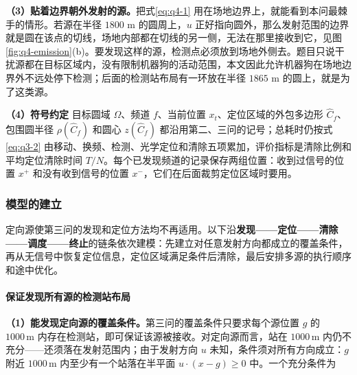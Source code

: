 \textbf{（3）贴着边界朝外发射的源。}把式\eqref{eq:q4-1} 用在场地边界上，就能看到本问最棘手的情形。若源在半径 $1800$ m 的圆周上，$u$ 正好指向圆外，那么发射范围的边界就是圆在该点的切线，场地内部都在切线的另一侧，无法在那里接收到它，见图\ref{fig:q4-emission}(b)。要发现这样的源，检测点必须放到场地外侧去。题目只说干扰源都在目标区域内，没有限制机器狗的活动范围，本文因此允许机器狗在场地边界外不远处停下检测；后面的检测站布局有一环放在半径 $1865$ m 的圆上，就是为了这类源。

\begin{center}
\begin{minipage}{\linewidth}
\centering
\QFourEmissionFigure
{}
\label{fig:q4-emission}
\end{minipage}
\end{center}

\textbf{（4）符号约定 }目标圆域 $\Omega$、频道 $f$、当前位置 $x_t$、定位区域的外包多边形 $\widehat C_f$、包围圆半径 $\rho(\widehat C_f)$ 和圆心 $z(\widehat C_f)$ 都沿用第二、三问的记号；总耗时仍按式\eqref{eq:q3-2} 由移动、换频、检测、光学定位和清除五项累加，评价指标是清除比例和平均定位清除时间 $T/N$。每个已发现频道的记录保存两组位置：收到过信号的位置 $x^+$ 和没有收到信号的位置 $x^-$，它们在后面裁剪定位区域时要用。

\subsubsection{模型的建立}\label{sec:q4-2}

定向源使第三问的发现和定位方法均不再适用。以下沿\textbf{发现——定位——清除——调度——终止}的链条依次建模：先建立对任意发射方向都成立的覆盖条件，再从无信号中恢复定位信息，定位区域满足条件后清除，最后安排多源的执行顺序和途中优化。

\paragraph{保证发现所有源的检测站布局}

\textbf{（1）能发现定向源的覆盖条件。}第三问的覆盖条件只要求每个源位置 $g$ 的 $1000\,\mathrm{m}$ 内存在检测站，即可保证该源被接收。对定向源而言，站在 $1000\,\mathrm{m}$ 内仍不充分——还须落在发射范围内；由于发射方向 $u$ 未知，条件须对所有方向成立：$g$ 附近 $1000\,\mathrm{m}$ 内至少有一个站落在半平面 $u\cdot(x-g)\ge0$ 中。一个充分条件为


